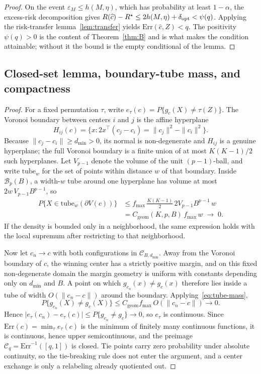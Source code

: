 \begin{proof}
On the event $\varepsilon_M\le h(M,\eta)$, which has probability at least $1-\alpha$, the excess-risk decomposition gives $R(\widehat c)-R^\star\le2h(M,\eta)+\delta_{\rm opt}<\psi(q)$. Applying the risk-transfer lemma~\ref{lem:transfer} yields $\mathrm{Err}(\widehat c,Z)<q$. The positivity $\psi(q)>0$ is the content of Theorem~\ref{thm:B} and is what makes the condition attainable; without it the bound is the empty conditional of the lemma.
\end{proof}

\subsection{Closed-set lemma, boundary-tube mass, and
compactness}\label{closed-set-lemma-boundary-tube-mass-and-compactness}

\begin{proof}
For a fixed permutation $\tau$, write $e_\tau(c)=P\{g_c(X)\ne\tau(Z)\}$. The Voronoi boundary between centers $i$ and $j$ is the affine hyperplane
$$H_{ij}(c)=\{x:2x^\top(c_j-c_i)=\|c_j\|^2-\|c_i\|^2\}.$$
Because $\|c_j-c_i\|\ge d_{\min}>0$, its normal is non-degenerate and $H_{ij}$ is a genuine hyperplane; the full Voronoi boundary is a finite union of at most $K(K-1)/2$ such hyperplanes. Let $V_{p-1}$ denote the volume of the unit $(p-1)$-ball, and write $\mathrm{tube}_w$ for the set of points within distance $w$ of that boundary. Inside $\mathcal B_p(B)$, a width-$w$ tube around one hyperplane has volume at most $2w\,V_{p-1}B^{p-1}$, so
\begin{equation}\label{eq:tube-mass}
\begin{aligned}
P\{X\in\mathrm{tube}_w(\partial V(c))\}
&\le f_{\max}\,\frac{K(K-1)}2\,2V_{p-1}B^{p-1}\,w\\
&= C_{\mathrm{geom}}(K,p,B)\,f_{\max}\,w\;\longrightarrow\;0.
\end{aligned}
\end{equation}
If the density is bounded only in a neighborhood, the same expression holds with the local supremum after restricting to that neighborhood.

Now let $c_n\to c$ with both configurations in $\mathcal C_{B,d_{\min}}$. Away from the Voronoi boundary of $c$, the winning center has a strictly positive margin, and on this fixed non-degenerate domain the margin geometry is uniform with constants depending only on $d_{\min}$ and $B$. A point on which $g_{c_n}(x)\ne g_c(x)$ therefore lies inside a tube of width $O(\|c_n-c\|)$ around the boundary. Applying~\eqref{eq:tube-mass},
$$P\{g_{c_n}(X)\ne g_c(X)\}\le C_{\mathrm{geom}}f_{\max}\,O(\|c_n-c\|)\to0.$$
Hence $|e_\tau(c_n)-e_\tau(c)|\le P\{g_{c_n}\ne g_c\}\to0$, so $e_\tau$ is continuous. Since $\mathrm{Err}(c)=\min_\tau e_\tau(c)$ is the minimum of finitely many continuous functions, it is continuous, hence upper semicontinuous, and the preimage $\mathcal C_q=\mathrm{Err}^{-1}([q,1])$ is closed. Tie points carry zero probability under absolute continuity, so the tie-breaking rule does not enter the argument, and a center exchange is only a relabeling already quotiented out.
\end{proof}


